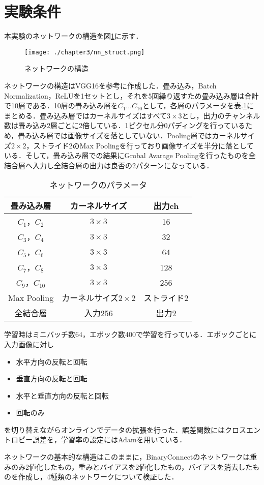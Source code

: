 \section{実験条件}
本実験のネットワークの構造を図\ref{fig_nnst}に示す．
\begin{figure}[]
  \begin{center}
    \texttt{[image: ./chapter3/nn\_struct.png]}
    \caption{ネットワークの構造}
    \label{fig_nnst}
  \end{center}
\end{figure}

ネットワークの構造はVGG16を参考に作成した．畳み込み，Batch Normalization，ReLUを1セットとし，それを5回繰り返すため畳み込み層は合計で10層である．10層の畳み込み層を$C_1 \ldots C_{10}$として，各層のパラメータを表.\ref{table_network_parameter}にまとめる．畳み込み層ではカーネルサイズはすべて$3\times 3$とし，出力のチャンネル数は畳み込み2層ごとに2倍している．1ピクセル分0パディングを行っているため，畳み込み層では画像サイズを落としていない．Pooling層ではカーネルサイズ$2\times 2$，ストライド2のMax Poolingを行っており画像サイズを半分に落としている．そして，畳み込み層での結果にGrobal Avarage Poolingを行ったものを全結合層へ入力し全結合層の出力は良否の2パターンになっている．
\begin{table}
  \caption{ネットワークのパラメータ}
  \label{table_network_parameter}
  \centering
  \begin{tabular}{ccc}
    \hline
    畳み込み層  & カーネルサイズ & 出力ch \\
    \hline \hline
    $C_1$，$C_2$ & $3\times 3$ & 16\\
    $C_3$，$C_4$ & $3\times 3$ & 32\\
    $C_5$，$C_6$ & $3\times 3$ & 64\\
    $C_7$，$C_8$ & $3\times 3$ & 128\\
    $C_9$，$C_{10}$ & $3\times 3$ & 256\\
    \hline
    Max Pooling & カーネルサイズ$2\times 2$ & ストライド2\\
    全結合層 & 入力256 & 出力2\\
    \hline
  \end{tabular}
\end{table}

学習時はミニバッチ数64，エポック数400で学習を行っている．エポックごとに入力画像に対し
\begin{itemize}
  \item 水平方向の反転と回転
  \item 垂直方向の反転と回転
  \item 水平と垂直方向の反転と回転
  \item 回転のみ
\end{itemize}
を切り替えながらオンラインでデータの拡張を行った．誤差関数にはクロスエントロピー誤差を，学習率の設定にはAdamを用いている．

ネットワークの基本的な構造はこのままに，BinaryConnectのネットワークは重みのみ2値化したもの，重みとバイアスを2値化したもの，バイアスを消去したものを作成し，4種類のネットワークについて検証した．